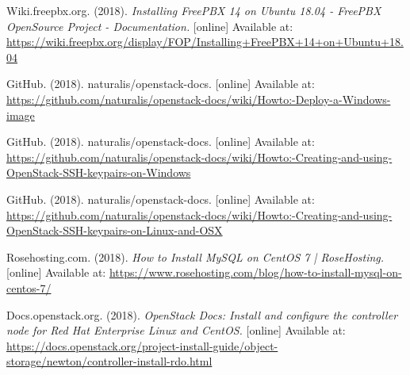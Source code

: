 \documentclass{article}
\begin{document}
\begin{thebibliography}{9}
  Wiki.freepbx.org. (2018). \emph{Installing FreePBX 14 on Ubuntu 18.04 - FreePBX OpenSource Project - Documentation.}
  [online] Available at: \url{https://wiki.freepbx.org/display/FOP/Installing+FreePBX+14+on+Ubuntu+18.04}

  GitHub. (2018). naturalis/openstack-docs.
  [online] Available at: \url{https://github.com/naturalis/openstack-docs/wiki/Howto:-Deploy-a-Windows-image}

  GitHub. (2018). naturalis/openstack-docs.
  [online] Available at: \url{https://github.com/naturalis/openstack-docs/wiki/Howto:-Creating-and-using-OpenStack-SSH-keypairs-on-Windows}

  GitHub. (2018). naturalis/openstack-docs.
  [online] Available at: \url{https://github.com/naturalis/openstack-docs/wiki/Howto:-Creating-and-using-OpenStack-SSH-keypairs-on-Linux-and-OSX}

  Rosehosting.com. (2018). \emph{How to Install MySQL on CentOS 7 | RoseHosting.}
  [online] Available at: \url{https://www.rosehosting.com/blog/how-to-install-mysql-on-centos-7/}

  Docs.openstack.org. (2018). \emph{OpenStack Docs: Install and configure the controller node for Red Hat Enterprise Linux and CentOS.}
  [online] Available at: \url{https://docs.openstack.org/project-install-guide/object-storage/newton/controller-install-rdo.html}

\end{thebibliography}
\end{document}
